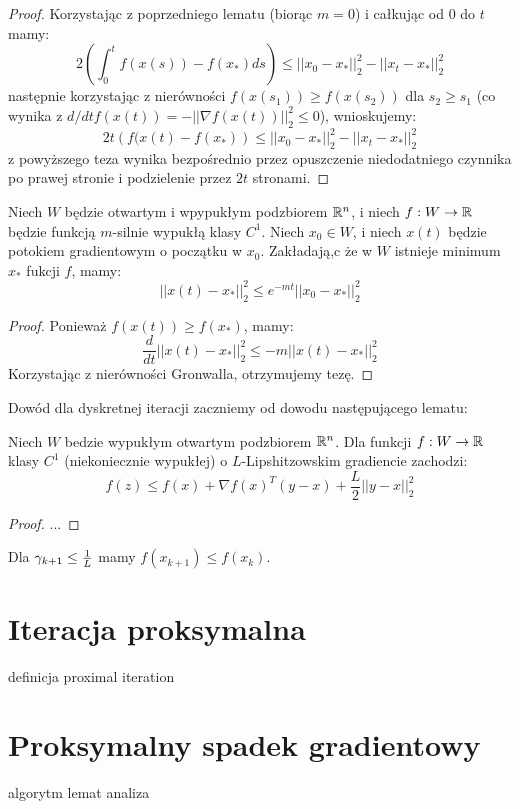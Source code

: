 \documentclass[10pt,a4paper,draft]{report}
\begin{document}
\begin{proof}
Korzystając z poprzedniego lematu (biorąc $m=0$) i całkując od $0$ do $t$ mamy:
\[
2 \left( \int_0^t f(x(s)) - f(x_*) ds \right) \leq ||x_0 - x_*||_2^2 - ||x_t - x_*||_2^2  
\]
następnie korzystając z nierówności $f(x(s_1)) \geq f(x(s_2))$ dla $s_2 \geq s_1$ (co wynika z $d/dt f(x(t)) = - ||\nabla f(x(t))||_2^2 \leq 0$), wnioskujemy:
\[
2t \left( f(x(t) - f(x_*) \right) \leq ||x_0 - x_*||_2^2 - ||x_t - x_*||_2^2  
\]
z powyższego teza wynika bezpośrednio przez opuszczenie niedodatniego czynnika po prawej stronie i podzielenie przez $2t$ stronami.
\end{proof}
\begin{lemma}
Niech $W$ będzie otwartym i wpypukłym podzbiorem $\mathbb{R}^n$, i niech $f : W \rightarrow \mathbb{R}$ będzie funkcją $m$-silnie wypukłą klasy $C^1$. Niech $x_0 \in W$, i niech $x(t)$ będzie potokiem gradientowym o początku w $x_0$. Zakładają,c że w $W$ istnieje minimum $x_*$ fukcji $f$, mamy:
\[
||x(t) - x_*||_2^2 \leq e^{-mt} ||x_0 - x_*||_2^2
\]
\end{lemma}
\begin{proof}
Ponieważ $f(x(t)) \geq f(x_*)$, mamy:
\[
\frac{d}{dt} ||x(t) - x_*||_2^2 \leq - m||x(t) - x_*||_2^2
\]
Korzystając z nierówności Gronwalla, otrzymujemy tezę.
\end{proof}

Dowód dla dyskretnej iteracji zaczniemy od dowodu następującego lematu:
\begin{lemma}
Niech $W$ bedzie wypukłym otwartym podzbiorem $\mathbb{R}^n$. Dla funkcji $f : W \rightarrow \mathbb{R}$ klasy $C^1$ (niekoniecznie wypukłej) o $L$-Lipshitzowskim gradiencie zachodzi:
\[
f(z) \leq f(x) + \nabla f(x)^T (y - x) + \frac{L}{2}||y - x||_2^2
\]
\end{lemma}
\begin{proof}
...
\end{proof}
\begin{corollary}
Dla $\gamma_{k+1} \leq \frac{1}{L}$ mamy $f(x_{k+1}) \leq f(x_k)$.
\end{corollary}

\section{Iteracja proksymalna}
definicja
proximal iteration

\section{Proksymalny spadek gradientowy}
algorytm
lemat
analiza
\end{document}
